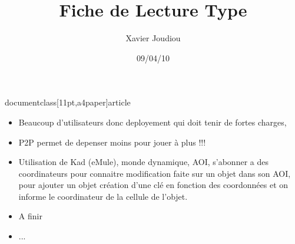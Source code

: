 documentclass[11pt,a4paper]{article}

\usepackage{../Ressources/LaTex/Fiche_Lecture_Type} %

\usepackage{fancyhdr}
\pagestyle{basdepage}

\title{Fiche de Lecture Type}
\author{Xavier Joudiou}
\date{09/04/10}


	
  \begin{itemize}
  \renewcommand{\labelitemi}{$\Rightarrow$}
	\item Beaucoup d'utilisateurs donc deployement qui doit tenir de fortes charges,
	\item P2P permet de depenser moins pour jouer à plus !!!
	\item Utilisation de Kad (eMule), monde dynamique, AOI, s'abonner a des coordinateurs pour connaitre modification faite sur un objet dans son AOI, pour ajouter un objet création d'une clé en fonction des coordonnées et on informe le coordinateur de la cellule de l'objet.
	\item A finir   
	\item ...
  \end{itemize}

  
